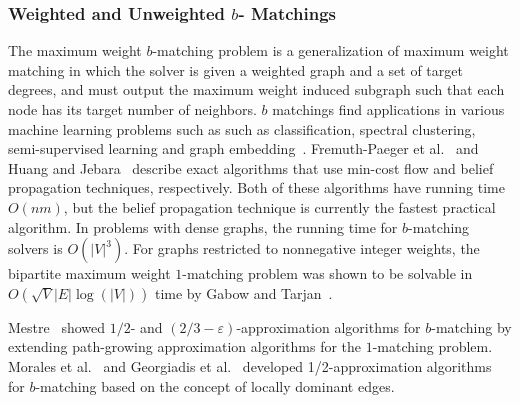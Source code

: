 \documentclass{scrartcl}
\begin{document}
\subsubsection{Weighted and Unweighted $b$- Matchings}
The maximum weight $b$-matching problem is a
generalization of maximum weight matching in which
the solver is given a weighted graph and a set of target
degrees, and must output the maximum weight
induced subgraph such that each node has its target
number of neighbors. $b$ matchings find applications in various machine learning problems such as such as classification, spectral clustering, semi-supervised learning and graph embedding~\cite{JH}.
 Fremuth-Paeger et al.~\cite{FPCJD}  and Huang and Jebara~\cite{JH} describe exact algorithms that use min-cost flow and belief propagation techniques, respectively. Both of these algorithms have running time $O(nm)$, but the belief propagation technique is currently the fastest practical algorithm.
In problems with dense
graphs, the running time for $b$-matching solvers is $O(|V|^3)$. For graphs restricted to nonnegative integer weights,
the bipartite maximum weight $1$-matching problem
was shown to be solvable in $O(\sqrt{V}|E| \log(|V |))$ time
by Gabow and Tarjan~\cite{GabowTarjan}.

Mestre~\cite{Mestre}  showed $1/2$- and $(2/3 - \varepsilon)$-approximation algorithms for $b$-matching by extending path-growing approximation algorithms for the $1$-matching problem. Morales et al.~\cite{DeFrancisciMorales} and Georgiadis et al.~\cite{GeorgiadisP13} developed 1/2-approximation algorithms for $b$-matching based on the concept of locally dominant edges.

 
 
\end{document}
